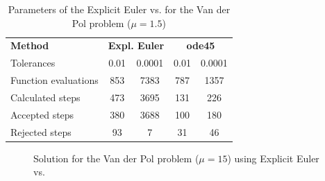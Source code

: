 \begin{table}[H]
    \centering
    \begin{tabular}{@{}l|cc|cc@{}}
    \toprule
    \textbf{Method} & \multicolumn{2}{c|}{\textbf{Expl. Euler}} & \multicolumn{2}{c}{\textbf{ode45}} \\
    Tolerances           & 0.01           & 0.0001          & 0.01       & 0.0001       \\ \midrule
    Function evaluations & 853            & 7383            & 787        & 1357         \\
    Calculated steps     & 473            & 3695            & 131        & 226          \\
    Accepted steps       & 380            & 3688            & 100        & 180          \\
    Rejected steps       & 93             & 7               & 31         & 46           \\ \bottomrule
    \end{tabular}
    \caption{Parameters of the Explicit Euler vs.  for the Van der Pol problem ($\mathit{\mu = 1.5}$)}
    \label{2_6_adaptive_mu_1_5_table}
\end{table}

\begin{figure}[H]
    \centering
    \caption{Solution for the Van der Pol problem ($\mathit{\mu = 15}$) using Explicit Euler vs. }
    \label{2_6_mu_15}
\end{figure}

